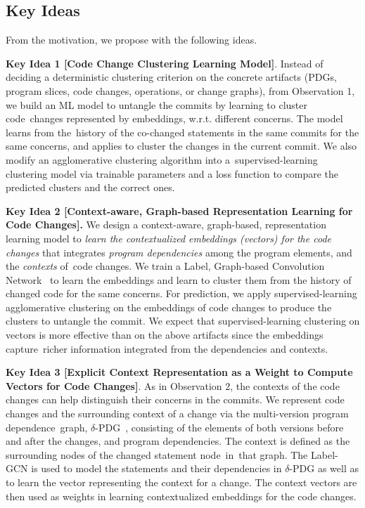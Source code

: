 \subsection{Key Ideas}
\label{ideas:sec}

From the motivation, we propose {\tool} with the following
ideas.


{\bf Key Idea 1 [Code Change Clustering Learning Model]}. Instead of
deciding a deterministic clustering criterion on the concrete
artifacts (PDGs, program slices, code changes, operations, or change
graphs), from Observation 1, we build an ML model to untangle the
commits by learning to cluster code~changes represented by embeddings,
w.r.t. different concerns. The model learns from the~history of the
co-changed statements in the same commits for the same concerns, and
applies to cluster the changes in the current commit.  We also modify
an agglomerative clustering algorithm into a~super\-vised-learning
clustering model via trainable parameters and a loss function to
compare the predicted clusters and the correct ones.

{\bf Key Idea 2 [Context-aware, Graph-based Representation Learning
    for Code Changes].} We design a context-aware, graph-based,
representation learning model to {\em learn the contextualized
  embeddings (vectors) for the code changes} that integrates {\em
  program dependencies} among the program elements, and the {\em
  contexts} of~code changes. We train a Label, Graph-based Convolution
Network~\cite{label-gcn} to learn the embeddings and learn to
cluster them from the history of changed code for the same concerns.
For prediction, we apply supervised-learning agglomerative
clustering on the embeddings of code changes to produce the clusters
to untangle the commit. We expect that supervised-learning clustering
on vectors is more effective than on the above artifacts since the
embeddings capture~richer information integrated from the
dependencies and contexts.


{\bf Key Idea 3 [Explicit Context Representation as a Weight to
    Compute Vectors for Code Changes]}. As in Observation 2, the
contexts of the code changes can help distinguish their concerns in
the commits. We represent code changes and the surrounding context of
a change via the multi-version program dependence~graph,
$\delta$-PDG~\cite{flexeme-fse20}, consisting of the elements of both
versions before and after the changes, and program dependencies. The
context is defined as the surrounding nodes of the changed statement
node~in~that graph. The Label-GCN is used to model the statements and
their dependencies in $\delta$-PDG as well as to learn the vector
representing the context for a change. The context vectors are then
used as weights in learning contextualized embeddings for the code
changes.

